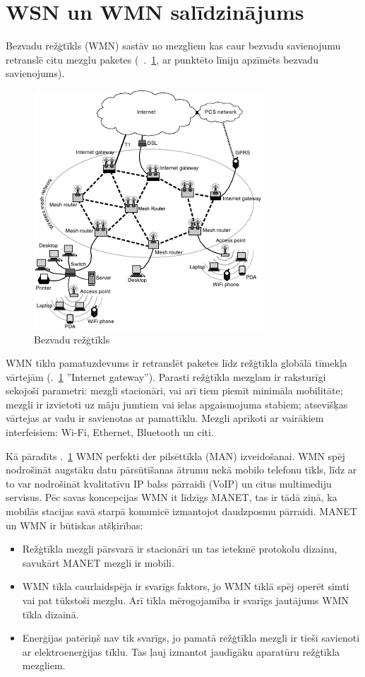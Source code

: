 \section{WSN un WMN salīdzinājums}
Bezvadu režģtīkls (WMN) sastāv no mezgliem kas caur bezvadu savienojumu retranslē citu mezglu paketes (\seename ~\figurename.~\ref{fig:wmn}, ar punktēto līniju apzīmēts bezvadu savienojums).
\begin{figure}[!htb]
\centering
\includegraphics[scale=1]{./graph/wmn}
\caption{Bezvadu režģtīkls \cite{perkinsBook}}
\label{fig:wmn}
\end{figure}

 WMN tīklu pamatuzdevums ir retranslēt paketes  līdz režģtīkla globālā tīmekļa vārtejām (\figurename.~\ref{fig:wmn} ''Internet gateway''). Parasti režģtīkla mezglam ir raksturīgi sekojoši parametri: mezgli stacionāri, vai arī tiem piemīt minimāla mobilitāte; mezgli ir izvietoti uz māju jumtiem vai ielas apgaismojuma stabiem; atsevišķas vārtejas ar vadu ir savienotas ar pamattīklu. Mezgli aprīkoti ar vairākiem interfeisiem: Wi-Fi, Ethernet, Bluetooth un citi.

Kā pāradīts \figurename.~\ref{fig:wmn} WMN perfekti der pilsēttīkla (\acs{MAN}) izveidošanai. WMN spēj nodrošināt augstāku datu pārsūtīšanas ātrumu nekā mobilo telefonu tīkls, līdz ar to var nodrošināt kvalitatīvu IP balss pārraidi (VoIP) un citus multimediju servisus.
Pēc savas koncepcijas WMN it līdzīgs MANET, tas ir tādā ziņā, ka mobilās stacijas savā starpā komunicē izmantojot daudzposmu pārraidi. MANET un WMN ir būtiskas atšķirības:
\begin{itemize}
\item Režģtīkla mezgli pārsvarā ir stacionāri un tas ietekmē protokolu dizainu, savukārt MANET mezgli ir mobili.
\item WMN tīkla caurlaidspēja ir svarīgs faktors, jo WMN tīklā spēj operēt simti vai pat tūkstoši mezglu. Arī tīkla mērogojamība ir svarīgs jautājums WMN tīkla dizainā.
\item Enerģijas patēriņš nav tik svarīgs, jo pamatā režģtīkla mezgli ir tieši savienoti ar elektroenerģijas tīklu. Tas ļauj izmantot jaudīgāku aparatūru režģtīkla mezgliem.
\end{itemize}

